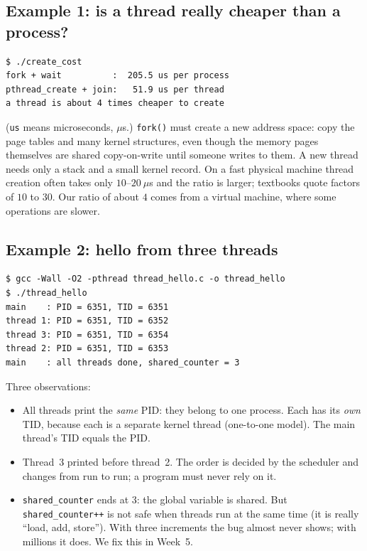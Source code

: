 \documentclass[11pt,a4paper]{article}
\newcommand{\cmd}[1]{\texttt{#1}}
\begin{document}
\subsection{Example 1: is a thread really cheaper than a process?}
\label{sec:createcost}



\begin{lstlisting}[style=term]
$ ./create_cost
fork + wait          :  205.5 us per process
pthread_create + join:   51.9 us per thread
a thread is about 4 times cheaper to create
\end{lstlisting}

(\texttt{us} means microseconds, $\mu$s.) \cmd{fork()} must create a new address space: copy the page tables and many kernel structures, even though the memory pages themselves are shared copy-on-write until someone writes to them. A new thread needs only a stack and a small kernel record. On a fast physical machine thread creation often takes only $10$--$20\ \mu$s and the ratio is larger; textbooks quote factors of $10$ to $30$. Our ratio of about $4$ comes from a virtual machine, where some operations are slower.

\subsection{Example 2: hello from three threads}



\begin{lstlisting}[style=term]
$ gcc -Wall -O2 -pthread thread_hello.c -o thread_hello
$ ./thread_hello
main    : PID = 6351, TID = 6351
thread 1: PID = 6351, TID = 6352
thread 3: PID = 6351, TID = 6354
thread 2: PID = 6351, TID = 6353
main    : all threads done, shared_counter = 3
\end{lstlisting}

Three observations:
\begin{itemize}
  \item All threads print the \emph{same} PID: they belong to one process. Each has its \emph{own} TID, because each is a separate kernel thread (one-to-one model). The main thread's TID equals the PID.
  \item Thread~3 printed before thread~2. The order is decided by the scheduler and changes from run to run; a program must never rely on it.
  \item \cmd{shared\_counter} ends at $3$: the global variable is shared. But \cmd{shared\_counter++} is not safe when threads run at the same time (it is really ``load, add, store''). With three increments the bug almost never shows; with millions it does. We fix this in Week~5.
\end{itemize}
\end{document}
